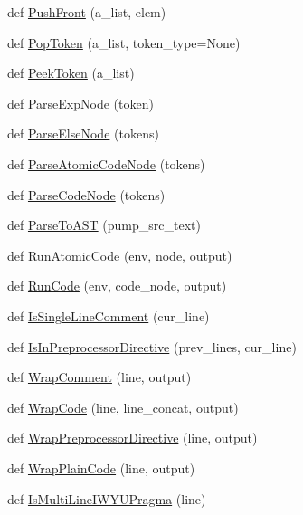 \begin{DoxyCompactItemize}
def \mbox{\hyperlink{namespacepump_a12c70577eb727526ac0ad17bf3b6c3a4}{Push\+Front}} (a\+\_\+list, elem)
\item 
def \mbox{\hyperlink{namespacepump_a45e1d5d5c1c188fc53eee8bd1e00e6b0}{Pop\+Token}} (a\+\_\+list, token\+\_\+type=None)
\item 
def \mbox{\hyperlink{namespacepump_ab12085e099ab4bd0cd968efdc435ec31}{Peek\+Token}} (a\+\_\+list)
\item 
def \mbox{\hyperlink{namespacepump_af62b08489d90e69d0577e82c98383ba7}{Parse\+Exp\+Node}} (token)
\item 
def \mbox{\hyperlink{namespacepump_ae40493525a993e81929c6905e329a406}{Parse\+Else\+Node}} (tokens)
\item 
def \mbox{\hyperlink{namespacepump_a5532710f334f026f80fc485decf5078e}{Parse\+Atomic\+Code\+Node}} (tokens)
\item 
def \mbox{\hyperlink{namespacepump_aabbc064b8664abbe05618b3a0f5a6c38}{Parse\+Code\+Node}} (tokens)
\item 
def \mbox{\hyperlink{namespacepump_a56ac10a83a3a875d305c9aae71fc0549}{Parse\+To\+A\+ST}} (pump\+\_\+src\+\_\+text)
\item 
def \mbox{\hyperlink{namespacepump_a901e6abd34691a0d779178a615cc09c1}{Run\+Atomic\+Code}} (env, node, output)
\item 
def \mbox{\hyperlink{namespacepump_ac6a714a44e28c2a19a1dfabeb9c9d4f1}{Run\+Code}} (env, code\+\_\+node, output)
\item 
def \mbox{\hyperlink{namespacepump_a417078b1d036b67756c47e5dc50324dc}{Is\+Single\+Line\+Comment}} (cur\+\_\+line)
\item 
def \mbox{\hyperlink{namespacepump_aa33101b01d5781710262f3b5dadd8bc8}{Is\+In\+Preprocessor\+Directive}} (prev\+\_\+lines, cur\+\_\+line)
\item 
def \mbox{\hyperlink{namespacepump_a73951c98652038351b1cd24291433e12}{Wrap\+Comment}} (line, output)
\item 
def \mbox{\hyperlink{namespacepump_a42502545a37fcd4513a0a7ac8ef3c0eb}{Wrap\+Code}} (line, line\+\_\+concat, output)
\item 
def \mbox{\hyperlink{namespacepump_a59e8ae06bae068d2d72df4f0340635d8}{Wrap\+Preprocessor\+Directive}} (line, output)
\item 
def \mbox{\hyperlink{namespacepump_a60723738cc38d8ced7e2cfecc72d8b11}{Wrap\+Plain\+Code}} (line, output)
\item 
def \mbox{\hyperlink{namespacepump_a707a3ff4514c89607e48a87589aed787}{Is\+Multi\+Line\+I\+W\+Y\+U\+Pragma}} (line)

\end{DoxyCompactItemize}
